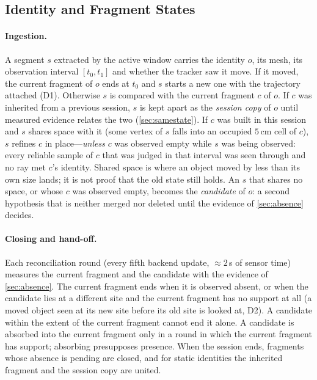 \subsection{Identity and Fragment States}
\label{sec:states}

\paragraph{Ingestion.}
A segment $s$ extracted by the active window carries the identity $o$, its mesh,
its observation interval $[t_0,t_1]$ and whether the tracker saw it move. If it
moved, the current fragment of $o$ ends at $t_0$ and $s$ starts a new one with
the trajectory attached (D1). Otherwise $s$ is compared with the current fragment
$c$ of $o$. If $c$ was inherited from a previous session, $s$ is kept apart as
the \emph{session copy} of $o$ until measured evidence relates the two
(\cref{sec:samestate}). If $c$ was built in this session and $s$ shares space
with it (some vertex of $s$ falls into an occupied $5$\,cm cell of $c$), $s$
refines $c$ in place---\emph{unless} $c$ was observed empty while $s$ was being
observed: every reliable sample of $c$ that was judged in that interval was seen
through and no ray met $c$'s identity. Shared space is where an object moved by
less than its own size lands; it is not proof that the old state still holds.
An $s$ that shares no space, or whose $c$ was observed empty, becomes the
\emph{candidate} of $o$: a second hypothesis that is neither merged nor deleted
until the evidence of \cref{sec:absence} decides.

\paragraph{Closing and hand-off.}
Each reconciliation round (every fifth backend update, $\approx 2$\,s of sensor
time) measures the current fragment and the candidate with the evidence of
\cref{sec:absence}. The current fragment ends when it is observed absent, or when
the candidate lies at a different site and the current fragment has no support
at all (a moved object seen at its new site before its old site is looked at,
D2). A candidate within the extent of the current fragment cannot end it alone.
A candidate is absorbed into the current fragment only in a round in which the
current fragment has support; absorbing presupposes presence. When the session
ends, fragments whose absence is pending are closed, and for static identities
the inherited fragment and the session copy are united.

